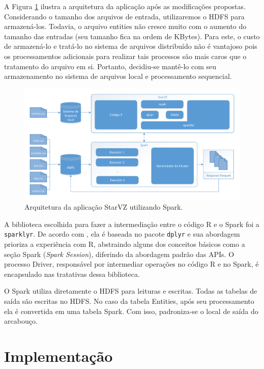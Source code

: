 A Figura \ref{fig:starvz-app-spark} ilustra a arquitetura da aplicação após as 
modificações propostas. Considerando o tamanho dos arquivos de entrada, 
utilizaremos o HDFS para armazená-los. Todavia, o arquivo entities não cresce 
muito com o aumento do tamanho das entradas (seu tamanho fica na ordem de 
KBytes). Para este, o custo de armazená-lo e tratá-lo no sistema de arquivos 
distribuído não é vantajoso pois os processamentos adicionais para realizar tais 
processos são mais caros que o tratamento do arquivo em si. Portanto, decidiu-se 
mantê-lo com seu armazenamento no sistema de arquivos local e processamento 
sequencial.

\begin{figure}[ht]
 \centerline{\includegraphics[width=1\textwidth]{./img/starvz-arch-spark.pdf}}
 \caption{Arquitetura da aplicação StarVZ utilizando Spark.}
 \label{fig:starvz-app-spark}
\end{figure}


A biblioteca escolhida para fazer a intermediação entre o código R e o Spark 
foi a \texttt{sparklyr}. De acordo com \citet{ref:sparkbook}, ela é 
baseada no pacote \texttt{dplyr} e sua abordagem prioriza a experiência com R, 
abstraindo alguns dos conceitos básicos como a seção Spark (\emph{Spark 
Session}), diferindo da abordagem padrão das APIs. O processo Driver, 
responsável por intermediar operações no código R e no Spark, é encapsulado nas 
tratativas dessa biblioteca. 

O Spark utiliza diretamente o HDFS para leituras e escritas. Todas as tabelas 
de saída são escritas no HDFS. No caso da tabela Entities, após seu 
processamento ela é convertida em uma tabela Spark. Com isso, padroniza-se o 
local de saída do arcabouço.



\section{Implementação} \label{sect:implement}

